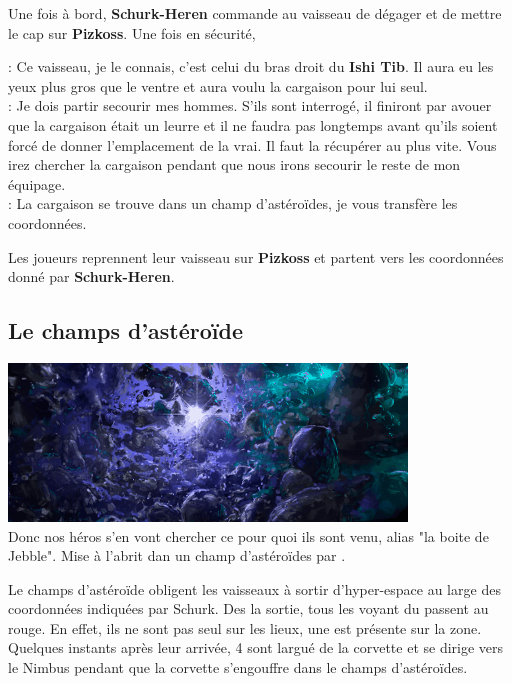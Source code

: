 Une fois à bord, \textbf{Schurk-Heren} commande au vaisseau de dégager et de mettre le cap sur \textbf{Pizkoss}. Une fois en sécurité, 
\begin{quotebox}
    : Ce vaisseau, je le connais, c’est celui du bras droit du \textbf{Ishi Tib}. Il aura eu les yeux plus gros que le ventre et aura voulu la cargaison pour lui seul.\\
    : Je dois partir secourir mes hommes. S’ils sont interrogé, il finiront par avouer que la cargaison était un leurre et il ne faudra pas longtemps avant qu’ils soient forcé de donner l’emplacement de la vrai. Il faut la récupérer au plus vite. Vous irez chercher la cargaison pendant que nous irons secourir le reste de mon équipage.\\
    : La cargaison se trouve dans un champ d’astéroïdes, je vous transfère les coordonnées.
\end{quotebox}

Les joueurs reprennent leur vaisseau sur \textbf{Pizkoss} et partent vers les coordonnées donné par \textbf{Schurk-Heren}.

\subsection{Le champs d’astéroïde}
\noindent\includegraphics[width=\linewidth]{_img/places/asteroid-field.png}\\

Donc nos héros s’en vont chercher ce pour quoi ils sont venu,  alias "la boite de Jebble". Mise à l’abrit dan un champ d’astéroïdes par .

Le champs d’astéroïde obligent les vaisseaux à sortir d’hyper-espace au large des coordonnées indiquées par Schurk. Des la sortie, tous les voyant du  passent au rouge. En effet, ils ne sont pas seul sur les lieux, une  est présente sur la zone. Quelques instants après leur arrivée, 4  sont largué de la corvette et se dirige vers le Nimbus pendant que la corvette s’engouffre dans le champs d’astéroïdes.

